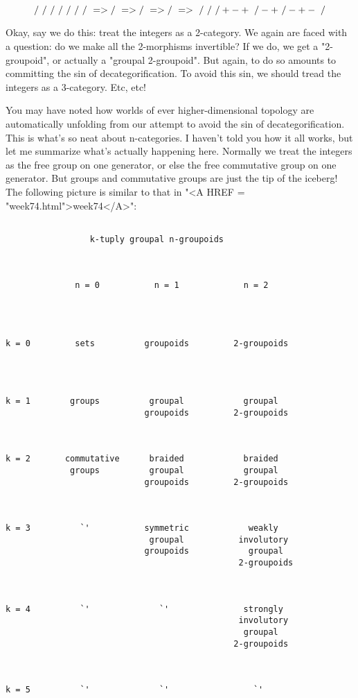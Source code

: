 $$

                   /\
                  /  \           /\
                 /    \         /  \       /\
                /      \   =>  /    \  => /  \  => /\  =>
                \      /       \    /     \  /    +\/-
                +\    /-       +\  /-     +\/-
                  \  /           \/
                   \/


$$
    
Okay, say we do this: treat the integers as a 2-category.  We again are
faced with a question: do we make all the 2-morphisms invertible?  If we
do, we get a "2-groupoid", or actually a "groupal 2-groupoid".  But
again, to do so amounts to committing the sin of decategorification.  To
avoid this sin, we should tread the integers as a 3-category.  Etc, etc!

You may have noted how worlds of ever higher-dimensional topology are
automatically unfolding from our attempt to avoid the sin of
decategorification.  This is what's so neat about n-categories.  I
haven't told you how it all works, but let me summarize what's actually
happening here.  Normally we treat the integers as the free group on
one generator, or else the free commutative group on one generator.  
But groups and commutative groups are just the tip of the iceberg!
The following picture is similar to that in "<A HREF = "week74.html">week74</A>":


\begin{verbatim}

                 k-tuply groupal n-groupoids



              n = 0           n = 1             n = 2




k = 0         sets          groupoids         2-groupoids
     



k = 1        groups          groupal            groupal
                            groupoids         2-groupoids



k = 2       commutative      braided            braided
             groups          groupal            groupal
                            groupoids         2-groupoids



k = 3          `'           symmetric            weakly
                             groupal           involutory
                            groupoids            groupal 
                                               2-groupoids



k = 4          `'              `'               strongly 
                                               involutory
                                                groupal
                                              2-groupoids



k = 5          `'              `'                 `'


\end{verbatim}
    
